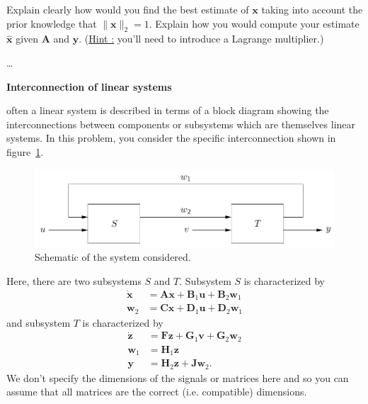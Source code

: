 \documentclass[12pt]{exam}
\begin{document}
\begin{questions}
  Explain clearly how would you find the best estimate of $\bm{x}$ taking into account the prior knowledge that $\| \bm{x} \|_2 = 1$.
  Explain how you would compute your estimate $\hat{\bm{x}}$ given $\bm{A}$ and $\bm{y}$. (\underline{Hint :} you'll need to introduce a Lagrange multiplier.)


  \begin{solution}
    {\color{blue}
      \ldots
    }
  \end{solution}





  \question \textbf{Interconnection of linear systems}

  often a linear system is described in terms of a block diagram showing the interconnections between components or subsystems which are themselves linear systems.
  In this problem, you consider the specific interconnection shown in figure~\ref{fig: interconnection of linear systems}.

  \begin{figure}
    \centering
    \includegraphics[width=.8\textwidth]{lti_system.png}
    \caption{
      Schematic of the system considered.
    }
    \label{fig: interconnection of linear systems}
  \end{figure}

  Here, there are two subsystems $S$ and $T$.
  Subsystem $S$ is characterized by
  \[
  \begin{aligned}
    \dot{\bm{x}} & = \bm{Ax} + \bm{B}_1 \bm{u} + \bm{B}_2 \bm{w}_1 \\
    \bm{w}_2 & = \bm{Cx} + \bm{D}_1 \bm{u} + \bm{D}_2 \bm{w}_1
  \end{aligned}
  \]
  and subsystem $T$ is characterized by
  \[
  \begin{aligned}
    \dot{\bm{z}} & = \bm{Fz} + \bm{G}_1 \bm{v} + \bm{G}_2 \bm{w}_2 \\
    \bm{w}_1 & = \bm{H}_1 \bm{z} \\
    \bm{y} & = \bm{H}_2 \bm{z} + \bm{Jw}_2.
  \end{aligned}
  \]
  We don't specify the dimensions of the signals or matrices here and so you can assume that all matrices are the correct (i.e. compatible) dimensions.


\end{questions}
\end{document}
